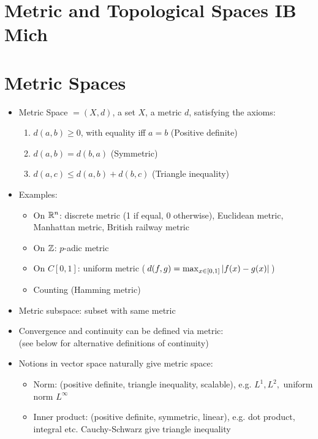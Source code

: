 



\section*{Metric and Topological Spaces \hfill IB Mich}

\section{Metric Spaces}
\begin{itemize}
    \item Metric Space $= (X,d)$, a set $X$, a metric $d$, satisfying the axioms:
          \begin{enumerate}
              \item $d(a,b) \geq 0 $, with equality iff $a=b$ (Positive definite)
              \item $d(a,b) = d(b,a) $ (Symmetric)
              \item $d(a,c) \leq d(a,b) + d(b,c)$ (Triangle inequality)
          \end{enumerate}
    \item Examples: \begin{itemize}
              \item On $\mathbb{R}^n$: discrete metric (1 if equal, 0 otherwise), Euclidean metric, Manhattan metric, British railway metric
              \item On $\mathbb{Z}$: $p$-adic metric
              \item On $C[0,1]$: uniform metric ($\, d(f,g) = \max_{x\in[0,1]} \left| f(x)-g(x) \right|\,$)
              \item Counting (Hamming metric)
          \end{itemize}
    \item Metric subspace: subset with same metric
    \item Convergence and continuity can be defined via metric: \\
          (see below for alternative definitions of continuity)
    \item Notions in vector space naturally give metric space:
          \begin{itemize}
              \item Norm: (positive definite, triangle inequality, scalable), e.g. $L^1, L^2,$ uniform norm $L^\infty$
              \item Inner product: (positive definite, symmetric, linear), e.g. dot product, integral etc. Cauchy-Schwarz give triangle inequality
          \end{itemize}
\end{itemize}

